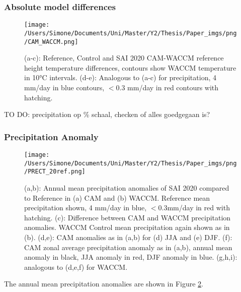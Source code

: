 \subsubsection{Absolute model differences}
\begin{figure}[H]
	\centering
	\texttt{[image: /Users/Simone/Documents/Uni/Master/Y2/Thesis/Paper\_imgs/png/CAM\_WACCM.png]}
	\caption{(a-c): Reference, Control and SAI 2020 CAM-WACCM reference height temperature differences, contours show WACCM temperature in 10°C intervals. (d-e): Analogous to (a-c) for precipitation, 4 mm/day in blue contours, $<0.3$ mm/day in red contours with hatching.}
	\label{fig:abs_diff}
\end{figure}

TO DO: precipitation op \% schaal, checken of alles goedgegaan is?

\subsubsection{Precipitation Anomaly}

\begin{figure}[H]
	\centering
	\texttt{[image: /Users/Simone/Documents/Uni/Master/Y2/Thesis/Paper\_imgs/png/PRECT\_20ref.png]}
	\caption{(a,b): Annual mean precipitation anomalies of SAI 2020 compared to Reference in (a) CAM and (b) WACCM. Reference mean precipitation shown, 4 mm/day in blue, $<0.3$mm/day in red with hatching. (c): Difference between CAM and WACCM precipitation anomalies. WACCM Control mean precipitation again shown as in (b). (d,e): CAM anomalies as in (a,b) for (d) JJA and (e) DJF. (f): CAM zonal average precipitation anomaly as in (a,b), annual mean anomaly in black, JJA anomaly in red, DJF anomaly in blue. (g,h,i): analogous to (d,e,f) for WACCM.}
	\label{fig:PRECT}
\end{figure}

The annual mean precipitation anomalies are shown in Figure \ref{fig:PRECT}.

